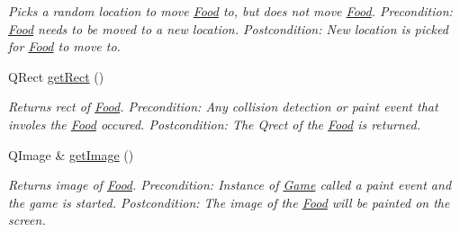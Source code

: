 \begin{DoxyCompactItemize}
\begin{DoxyCompactList}\small\item\em \-Picks a random location to move \hyperlink{classFood}{\-Food} to, but does not move \hyperlink{classFood}{\-Food}. \-Precondition\-: \hyperlink{classFood}{\-Food} needs to be moved to a new location. \-Postcondition\-: \-New location is picked for \hyperlink{classFood}{\-Food} to move to. \end{DoxyCompactList}\item 
\-Q\-Rect \hyperlink{classFood_a086048638fd5c0da29fa69594dc1a703}{get\-Rect} ()
\begin{DoxyCompactList}\small\item\em \-Returns rect of \hyperlink{classFood}{\-Food}. \-Precondition\-: \-Any collision detection or paint event that involes the \hyperlink{classFood}{\-Food} occured. \-Postcondition\-: \-The \-Qrect of the \hyperlink{classFood}{\-Food} is returned. \end{DoxyCompactList}\item 
\-Q\-Image \& \hyperlink{classFood_a8c6c5967ba2f578e35b2938381a1efd6}{get\-Image} ()
\begin{DoxyCompactList}\small\item\em \-Returns image of \hyperlink{classFood}{\-Food}. \-Precondition\-: \-Instance of \hyperlink{classGame}{\-Game} called a paint event and the game is started. \-Postcondition\-: \-The image of the \hyperlink{classFood}{\-Food} will be painted on the screen. \end{DoxyCompactList}\end{DoxyCompactItemize}
